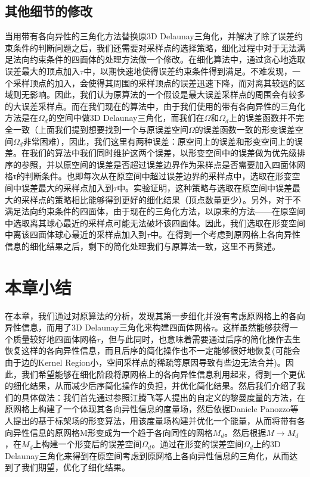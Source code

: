 \subsection{其他细节的修改}
当用带有各向异性的三角化方法替换原3D Delaunay三角化，并解决了除了误差约束条件的判断问题之后，我们还需要对采样点的选择策略，细化过程中对于无法满足法向约束条件的四面体的处理方法做一个修改。在细化算法中，通过贪心地选取误差最大的顶点加入$\tau$中，以期快速地使得误差约束条件得到满足。不难发现，一个采样顶点的加入，会使得其周围的采样顶点的误差迅速下降，而对离其较远的区域则无影响。因此，我们认为原算法的一个假设是最大误差采样点的周围会有较多的大误差采样点。而在我们现在的算法中，由于我们使用的带有各向异性的三角化方法是在$\Omega_d$的空间中做3D Delaunay三角化，而我们在$\Omega$和$\Omega_d$上的误差函数并不完全一致（上面我们提到想要找到一个与原误差空间$\Omega$的误差函数一致的形变误差空间$\Omega_d$非常困难），因此，我们这里有两种误差：原空间上的误差和形变空间上的误差。在我们的算法中我们同时维护这两个误差，以形变空间中的误差做为优先级排序的参照，并以原空间的误差是否超过误差边界作为采样点是否需要加入四面体网格τ的判断条件。也即每次从在原空间中超过误差边界的采样点中，选取在形变空间中误差最大的采样点加入到$\tau$中。实验证明，这种策略与选取在原空间中误差最大的采样点的策略相比能够得到更好的细化结果（顶点数量更少）。另外，对于不满足法向约束条件的四面体，由于现在的三角化方法，以原来的方法——在原空间中选取离其球心最近的采样点可能无法破坏该四面体。因此，我们选取在形变空间中离该四面体球心最近的采样点加入到$\tau$中。在得到一个考虑到原网格上各向异性信息的细化结果之后，剩下的简化处理我们与原算法一致，这里不再赘述。

\section{本章小结}
在本章，我们通过对原算法的分析，发现其第一步细化并没有考虑原网格上的各向异性信息，而用了3D Delaunay三角化来构建四面体网格$\tau$。这样虽然能够获得一个质量较好地四面体网格$\tau$，但与此同时，也意味着需要通过后序的简化操作去生恢复这样的各向异性信息，而且后序的简化操作也不一定能够很好地恢复(可能会由于边的Kernel Region小，空间采样点的稀疏等原因导致有些边无法合并)。因此，我们希望能够在细化阶段将原网格上的各向异性信息利用起来，得到一个更优的细化结果，从而减少后序简化操作的负担，并优化简化结果。然后我们介绍了我们的具体做法：我们首先通过参照江腾飞等人提出的自定义的黎曼度量的方法\cite{frame-field-gen}，在原网格上构建了一个体现其各向异性信息的度量场，然后依据Daniele Panozzo等人提出的基于标架场的形变算法\cite{frame-field-warping}，用该度量场构建并优化一个能量，从而将带有各向异性信息的原网格M形变成为一个趋于各向同性的网格$M_d$。然后根据$M \to M_d$，在$M_d$上构建一个形变后的误差空间$\Omega_d$。通过在形变的误差空间$\Omega_d$上的3D Delaunay三角化来得到在原空间考虑到原网格上各向异性信息的三角化，从而达到了我们期望，优化了细化结果。
